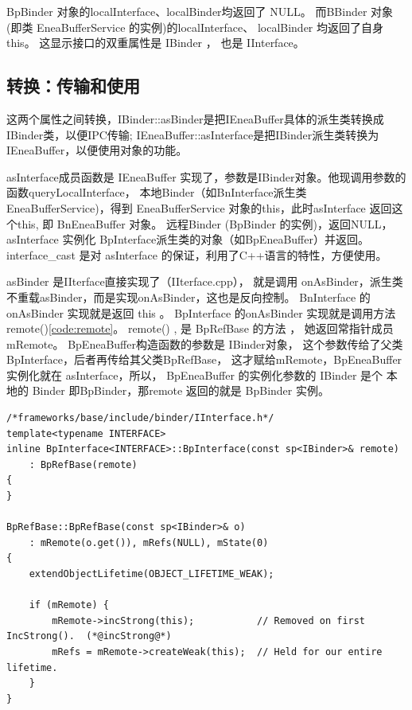 \documentclass[a4paper,11pt]{article}
\begin{document}
BpBinder 对象的localInterface、localBinder均返回了 NULL。
而BBinder 对象(即类 EneaBufferService 的实例)的localInterface、 localBinder 均返回了自身this。
这显示接口的双重属性是 IBinder ， 也是 IInterface。

\subsection{转换：传输和使用}

这两个属性之间转换，IBinder::asBinder是把IEneaBuffer具体的派生类转换成IBinder类，以便IPC传输; 
IEneaBuffer::asInterface是把IBinder派生类转换为IEneaBuffer，以便使用对象的功能。 


asInterface\label{code:asInterface}成员函数是
IEneaBuffer 实现了，参数是IBinder对象。他现调用参数的函数queryLocalInterface，
本地Binder（如BnInterface派生类EneaBufferService)，得到 EneaBufferService 对象的this，此时asInterface
返回这个this, 即 BnEneaBuffer 对象。 远程Binder (BpBinder 的实例)，返回NULL，
asInterface 实例化 BpInterface派生类的对象（如BpEneaBuffer）并返回。
interface_cast 是对 asInterface 的保证，利用了C++语言的特性，方便使用。

asBinder 是IIterface直接实现了（IIterface.cpp）， 就是调用 onAsBinder，派生类
不重载asBinder，而是实现onAsBinder，这也是反向控制。 BnInterface 的onAsBinder  实现就是返回 this 。
 BpInterface 的onAsBinder 实现就是调用方法 remote()\ref{code:remote}。
remote() \label{code:remote} , 是  BpRefBase 的方法
 ， 她返回常指针成员 mRemote。 BpEneaBuffer构造函数的参数是 IBinder对象，
 这个参数传给了父类BpInterface，后者再传给其父类BpRefBase， 这才赋给mRemote，BpEneaBuffer 实例化就在 asInterface，所以，
 BpEneaBuffer 的实例化参数的 IBinder 是个 本地的 Binder 即BpBinder，那remote
 返回的就是 BpBinder 实例。
\begin{lstlisting}[caption=BpInterface 的构造函数,label={BpInterfaceConstructor}]
/*frameworks/base/include/binder/IInterface.h*/
template<typename INTERFACE>
inline BpInterface<INTERFACE>::BpInterface(const sp<IBinder>& remote)
    : BpRefBase(remote)
{
}

BpRefBase::BpRefBase(const sp<IBinder>& o)
    : mRemote(o.get()), mRefs(NULL), mState(0)
{
    extendObjectLifetime(OBJECT_LIFETIME_WEAK);

    if (mRemote) {
        mRemote->incStrong(this);           // Removed on first IncStrong().  (*@incStrong@*)
        mRefs = mRemote->createWeak(this);  // Held for our entire lifetime.
    }
}

\end{lstlisting} 
\end{document}
